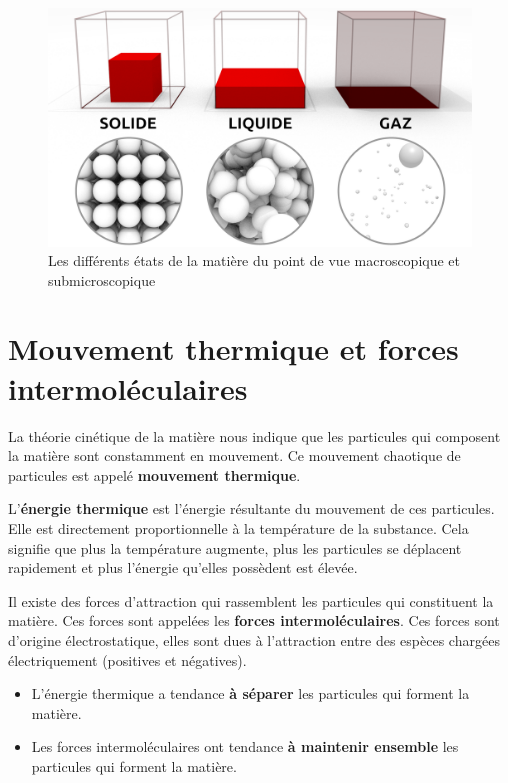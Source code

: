 \documentclass[
  11pt,
  french,
  a4paper,
  openany]{book}
\providecommand{\tightlist}{%
  \setlength{\itemsep}{0pt}\setlength{\parskip}{0pt}}
\begin{document}
\begin{figure}

{\centering \includegraphics[width=0.5\linewidth]{images/solide-liquide-gaz} 

}

\caption{Les différents états de la matière du point de vue macroscopique et submicroscopique}\label{fig:solide-liquide-gaz}
\end{figure}

\hypertarget{mouvement-thermique-et-forces-intermoluxe9culaires}{%
\section{Mouvement thermique et forces intermoléculaires}\label{mouvement-thermique-et-forces-intermoluxe9culaires}}

La théorie cinétique de la matière nous indique que les particules qui composent la matière sont constamment en mouvement. Ce mouvement chaotique de particules est appelé \textbf{mouvement thermique}.

L'\textbf{énergie thermique} est l'énergie résultante du mouvement de ces particules. Elle est directement proportionnelle à la température de la substance. Cela signifie que plus la température augmente, plus les particules se déplacent rapidement et plus l'énergie qu'elles possèdent est élevée.

Il existe des forces d'attraction qui rassemblent les particules qui constituent la matière. Ces forces sont appelées les \textbf{forces intermoléculaires}. Ces forces sont d'origine électrostatique, elles sont dues à l'attraction entre des espèces chargées électriquement (positives et négatives).

\begin{itemize}
\tightlist
\item
  L'énergie thermique a tendance \textbf{à séparer} les particules qui forment la matière.
\item
  Les forces intermoléculaires ont tendance \textbf{à maintenir ensemble} les particules qui forment la matière.
\end{itemize}
\end{document}
